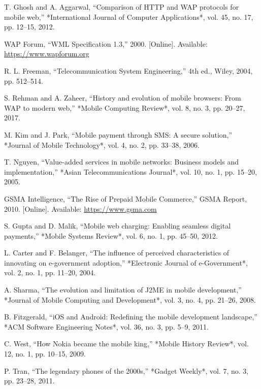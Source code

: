 \documentclass[12pt]{report}
\begin{document}
\begin{thebibliography}{1}
  T. Ghosh and A. Aggarwal, ``Comparison of HTTP and WAP protocols for mobile web,'' *International Journal of Computer Applications*, vol. 45, no. 17, pp. 12–15, 2012.

  WAP Forum, ``WML Specification 1.3,'' 2000. [Online]. Available: \url{https://www.wapforum.org}

  R. L. Freeman, ``Telecommunication System Engineering,'' 4th ed., Wiley, 2004, pp. 512–514.

  S. Rehman and A. Zaheer, ``History and evolution of mobile browsers: From WAP to modern web,'' *Mobile Computing Review*, vol. 8, no. 3, pp. 20–27, 2017.

  M. Kim and J. Park, ``Mobile payment through SMS: A secure solution,'' *Journal of Mobile Technology*, vol. 4, no. 2, pp. 33–38, 2006.

  T. Nguyen, ``Value-added services in mobile networks: Business models and implementation,'' *Asian Telecommunications Journal*, vol. 10, no. 1, pp. 15–20, 2005.

  GSMA Intelligence, ``The Rise of Prepaid Mobile Commerce,'' GSMA Report, 2010. [Online]. Available: \url{https://www.gsma.com}

  S. Gupta and D. Malik, ``Mobile web charging: Enabling seamless digital payments,'' *Mobile Systems Review*, vol. 6, no. 1, pp. 45–50, 2012.

  L. Carter and F. Belanger, ``The influence of perceived characteristics of innovating on e-government adoption,'' *Electronic Journal of e-Government*, vol. 2, no. 1, pp. 11–20, 2004.

  A. Sharma, ``The evolution and limitation of J2ME in mobile development,'' *Journal of Mobile Computing and Development*, vol. 3, no. 4, pp. 21–26, 2008.

  B. Fitzgerald, ``iOS and Android: Redefining the mobile development landscape,'' *ACM Software Engineering Notes*, vol. 36, no. 3, pp. 5–9, 2011.

  C. West, ``How Nokia became the mobile king,'' *Mobile History Review*, vol. 12, no. 1, pp. 10–15, 2009.

  P. Tran, ``The legendary phones of the 2000s,'' *Gadget Weekly*, vol. 7, no. 3, pp. 23–28, 2011.


\end{thebibliography}
\end{document}

